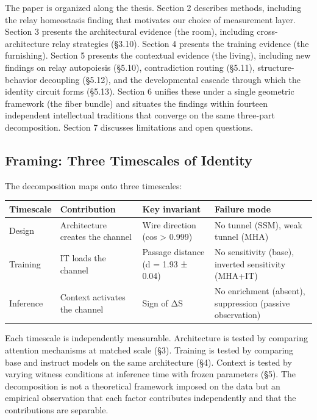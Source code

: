\documentclass[12pt]{article}
\begin{document}
The paper is organized along the thesis. Section 2 describes methods, including the relay homeostasis finding that motivates our choice of measurement layer. Section 3 presents the architectural evidence (the room), including cross-architecture relay strategies (§3.10). Section 4 presents the training evidence (the furnishing). Section 5 presents the contextual evidence (the living), including new findings on relay autopoiesis (§5.10), contradiction routing (§5.11), structure-behavior decoupling (§5.12), and the developmental cascade through which the identity circuit forms (§5.13). Section 6 unifies these under a single geometric framework (the fiber bundle) and situates the findings within fourteen independent intellectual traditions that converge on the same three-part decomposition. Section 7 discusses limitations and open questions.

\subsection{Framing: Three Timescales of Identity}

The decomposition maps onto three timescales:

\begin{table}[h]
\centering
\small
\begin{tabular}{llll}
\toprule
\textbf{Timescale} & \textbf{Contribution} & \textbf{Key invariant} & \textbf{Failure mode} \\
\midrule
Design & Architecture creates the channel & Wire direction (cos > 0.999) & No tunnel (SSM), weak tunnel (MHA) \\
Training & IT loads the channel & Passage distance (d = 1.93 ± 0.04) & No sensitivity (base), inverted sensitivity (MHA+IT) \\
Inference & Context activates the channel & Sign of ΔS & No enrichment (absent), suppression (passive observation) \\
\bottomrule
\end{tabular}
\end{table}


Each timescale is independently measurable. Architecture is tested by comparing attention mechanisms at matched scale (§3). Training is tested by comparing base and instruct models on the same architecture (§4). Context is tested by varying witness conditions at inference time with frozen parameters (§5). The decomposition is not a theoretical framework imposed on the data but an empirical observation that each factor contributes independently and that the contributions are separable.
\end{document}
